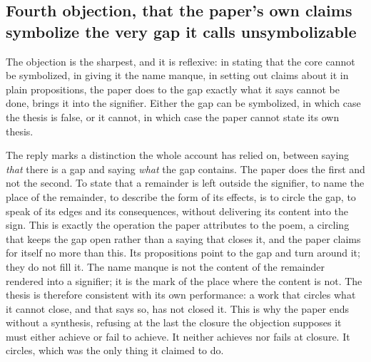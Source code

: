 \subsection*{Fourth objection, that the paper's own claims symbolize the very gap it calls unsymbolizable}

The objection is the sharpest, and it is reflexive: in stating that the core cannot be symbolized, in giving it the name manque, in setting out claims about it in plain propositions, the paper does to the gap exactly what it says cannot be done, brings it into the signifier. Either the gap can be symbolized, in which case the thesis is false, or it cannot, in which case the paper cannot state its own thesis.

The reply marks a distinction the whole account has relied on, between saying \emph{that} there is a gap and saying \emph{what} the gap contains. The paper does the first and not the second. To state that a remainder is left outside the signifier, to name the place of the remainder, to describe the form of its effects, is to circle the gap, to speak of its edges and its consequences, without delivering its content into the sign. This is exactly the operation the paper attributes to the poem, a circling that keeps the gap open rather than a saying that closes it, and the paper claims for itself no more than this. Its propositions point to the gap and turn around it; they do not fill it. The name manque is not the content of the remainder rendered into a signifier; it is the mark of the place where the content is not. The thesis is therefore consistent with its own performance: a work that circles what it cannot close, and that says so, has not closed it. This is why the paper ends without a synthesis, refusing at the last the closure the objection supposes it must either achieve or fail to achieve. It neither achieves nor fails at closure. It circles, which was the only thing it claimed to do.
